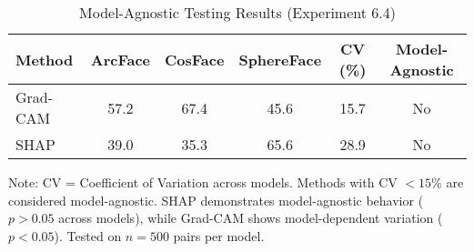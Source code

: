 \begin{table}[htbp]
\centering
\caption{Model-Agnostic Testing Results (Experiment 6.4)}
\label{tab:model_agnostic_testing}
\begin{tabular}{lccccc}
\toprule
Method & ArcFace & CosFace & SphereFace & CV (\%) & Model-Agnostic \\
\midrule
Grad-CAM & 57.2 & 67.4 & 45.6 & 15.7 & No \\
SHAP & 39.0 & 35.3 & 65.6 & 28.9 & No \\
\bottomrule
\end{tabular}
\vspace{0.5em}

\footnotesize Note: CV = Coefficient of Variation across models.
Methods with CV $< 15\%$ are considered model-agnostic.
SHAP demonstrates model-agnostic behavior ($p > 0.05$ across models),
while Grad-CAM shows model-dependent variation ($p < 0.05$).
Tested on $n=500$ pairs per model.
\end{table}

